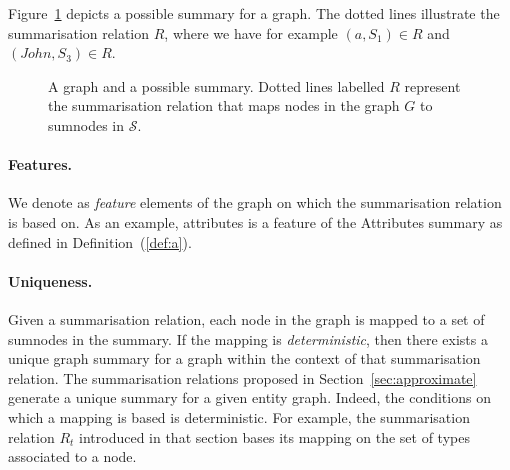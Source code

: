 Figure~\ref{fig:basic-summary} depicts a possible summary for a graph. The dotted lines illustrate the summarisation relation $R$, where we have for example $(a, S_1) \in R$ and $(John, S_3) \in R$.

\begin{figure}
	\centering
	\resizebox{.7\textwidth}{!}{
		
	}
	\caption[A graph and a possible summary]{A graph and a possible summary. Dotted lines labelled $R$ represent the summarisation relation that maps nodes in the graph $G$ to sumnodes in $\mathcal{S}$.}
	\label{fig:basic-summary}
\end{figure}

\paragraph{Features.}

We denote as \emph{feature} elements of the graph on which the summarisation relation is based on. As an example, attributes is a feature of the Attributes summary as defined in Definition~(\ref{def:a}).

\paragraph{Uniqueness.}

Given a summarisation relation, each node in the graph is mapped to a set of sumnodes in the summary. If the mapping is \emph{deterministic}, then there exists a unique graph summary for a graph within the context of that summarisation relation. The summarisation relations proposed in Section~\ref{sec:approximate} generate a unique summary for a given entity graph. Indeed, the conditions on which a mapping is based is deterministic. For example, the summarisation relation $R_t$ introduced in that section bases its mapping on the set of types associated to a node.


